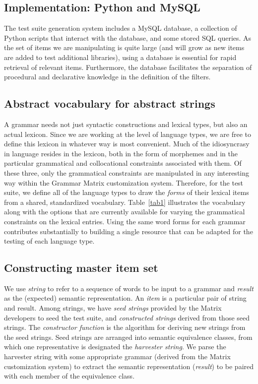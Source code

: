 \documentclass[11pt]{article}
\begin{document}
\subsection{Implementation: Python and MySQL}

The test suite generation system includes a MySQL database, a collection
of Python scripts that interact with the database, and some stored
SQL queries.  As the set of items we are manipulating is quite large
(and will grow as new items are added to test additional libraries),
using a database is essential for rapid retrieval of relevant items.
Furthermore, the database facilitates the separation of procedural
and declarative knowledge in the definition of the filters.

\subsection{Abstract vocabulary for abstract strings}

A grammar needs not just syntactic
constructions and lexical types, but also an actual lexicon.  Since we
are working at the level of language types,
we are free to define this lexicon in whatever way is most convenient.
Much of the idiosyncrasy in language resides in the lexicon, both in
the form of morphemes and in the particular grammatical and
collocational constraints associated with them.  Of these three, only
the grammatical constraints are manipulated in any interesting way
within the Grammar Matrix customization system.  Therefore, for the
test suite, we define all of the language types to draw the {\it
forms} of their lexical items from a shared, standardized vocabulary.
Table~\ref{tab1} illustrates the vocabulary along with the 
options that are currently available for varying the grammatical
constraints on the lexical entries.  Using the same word forms for
each grammar contributes substantially to building a single resource
that can be adapted for the testing of each language type.


\subsection{Constructing master item set}

We use {\it string} to refer to a sequence of words to be input to a
grammar and {\it result} as the (expected) semantic representation.
An {\it item} is a particular pair of string and result.  Among
strings, we have {\it seed strings} provided by the Matrix developers
to seed the test suite, and {\it constructed strings} derived from
those seed strings.  The {\it constructor function} is the algorithm
for deriving new strings from the seed strings. Seed strings are
arranged into semantic equivalence classes, from which one
representative is designated the {\it harvester string}.  We parse the
harvester string with some appropriate grammar (derived from the
Matrix customization system) to extract the semantic representation
({\it result}) to be paired with each member of the equivalence class.
\end{document}
